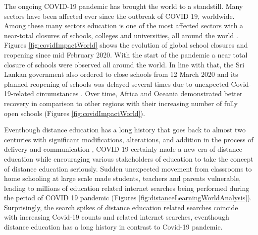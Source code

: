 \documentclass[11pt,a4paper,]{article}
\begin{document}
The ongoing COVID-19 pandemic has brought the world to a standstill. Many sectors have been affected ever since the outbreak of COVID 19, worldwide. Among these many sectors education is one of the most affected sectors with a near-total closures of schools, colleges and universities, all around the world \autocite{daniel2020education}. Figures \ref{fig:covidImpactWorld} shows the evolution of global school closures and reopening since mid February 2020. With the start of the pandemic a near total closure of schools were observed all around the world. In line with that, the Sri Lankan government also ordered to close schools from 12 March 2020 and its planned reopening of schools was delayed several times due to unexpected Covid-19-related circumstances \autocite{wikieducation}. Over time, Africa and Oceania demonstrated better recovery in comparison to other regions with their increasing number of fully open schools (Figures \ref{fig:covidImpactWorld}).

Eventhough distance education has a long history that goes back to almost two centuries \autocite{spector2014handbook} with significant modifications,
alterations, and addition in the process of delivery and communication \autocite{moore2011learning}, COVID 19 certainly made a new era of distance education while encouraging various stakeholders of education to take the concept of distance education seriously. Sudden unexpected movement from classrooms to home schooling at large scale made students, teachers and parents vulnerable, leading to millions of education related internet searches being performed during the period of COVID 19 pandemic (Figures \ref{fig:distanceLearningWorldAnalysis}). Surprisingly, the search spikes of distance education related searches coincide with increasing Covid-19 counts and related internet searches, eventhough distance education has a long history in contrast to Covid-19 pandemic.
\end{document}
